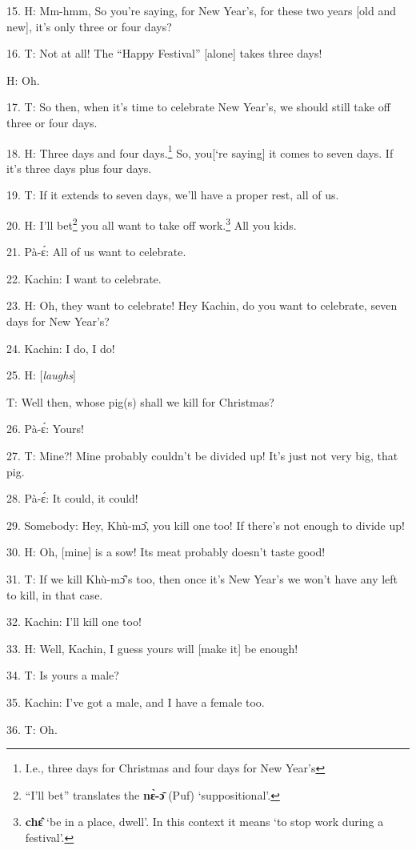 15. H: Mm-hmm, So you're saying, for New Year's, for these two years [old and
new], it's only three or four days?

16. T: Not at all! The ``Happy Festival'' [alone] takes three days!

H: Oh.

17. T: So then, when it's time to celebrate New Year's, we should still take off
three or four days.

18. H: Three days and four days.\footnote{I.e., three days for Christmas and four days for New Year's} So, you[`re saying] it comes to seven days.
If it's three days plus four days.

19. T: If it extends to seven days, we'll have a proper rest, all of us.

20. H: I'll bet\footnote{``I'll bet'' translates the \textbf{nɛ̀-ɔ̄} (Puf) `suppositional'.} you all want to take off work.\footnote{\textbf{chɛ̂} `be in a place, dwell'. In this context it means `to stop work during a festival'.} All you kids.

21. Pà-ɛ́: All of us want to celebrate.

22. Kachin: I want to celebrate.

23. H: Oh, they want to celebrate! Hey Kachin, do you want to celebrate, seven
days for New Year's?

24. Kachin: I do, I do!

25. H: [\textit{laughs}]

T: Well then, whose pig(s) shall we kill for Christmas?

26. Pà-ɛ́: Yours!

27. T: Mine?! Mine probably couldn't be divided up! It's just not very big, that
pig.

28. Pà-ɛ́: It could, it could!

29. Somebody: Hey, Khù-mɔ̂, you kill one too! If there's not enough to divide
up!

30. H: Oh, [mine] is a sow! Its meat probably doesn't taste good!

31. T: If we kill Khù-mɔ̂'s too, then once it's New Year's we won't have any
left to kill, in that case.

32. Kachin: I'll kill one too!

33. H: Well, Kachin, I guess yours will [make it] be enough!

34. T: Is yours a male?

35. Kachin: I've got a male, and I have a female too.

36. T: Oh.

